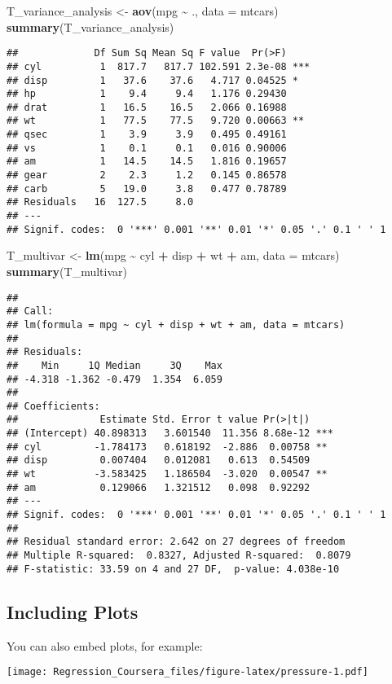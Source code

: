 \documentclass[
]{article}
\newenvironment{Shaded}{\begin{snugshade}}{\end{snugshade}}
\newcommand{\AttributeTok}[1]{\textcolor[rgb]{0.13,0.29,0.53}{#1}}
\newcommand{\FunctionTok}[1]{\textcolor[rgb]{0.13,0.29,0.53}{\textbf{#1}}}
\newcommand{\NormalTok}[1]{#1}
\newcommand{\OtherTok}[1]{\textcolor[rgb]{0.56,0.35,0.01}{#1}}
\newcommand{\SpecialCharTok}[1]{\textcolor[rgb]{0.81,0.36,0.00}{\textbf{#1}}}
\begin{document}
\begin{Shaded}
\begin{Highlighting}[]
\NormalTok{T\_variance\_analysis }\OtherTok{\textless{}{-}} \FunctionTok{aov}\NormalTok{(mpg }\SpecialCharTok{\textasciitilde{}}\NormalTok{ ., }\AttributeTok{data =}\NormalTok{ mtcars)}
\FunctionTok{summary}\NormalTok{(T\_variance\_analysis)}
\end{Highlighting}
\end{Shaded}

\begin{verbatim}
##             Df Sum Sq Mean Sq F value  Pr(>F)    
## cyl          1  817.7   817.7 102.591 2.3e-08 ***
## disp         1   37.6    37.6   4.717 0.04525 *  
## hp           1    9.4     9.4   1.176 0.29430    
## drat         1   16.5    16.5   2.066 0.16988    
## wt           1   77.5    77.5   9.720 0.00663 ** 
## qsec         1    3.9     3.9   0.495 0.49161    
## vs           1    0.1     0.1   0.016 0.90006    
## am           1   14.5    14.5   1.816 0.19657    
## gear         2    2.3     1.2   0.145 0.86578    
## carb         5   19.0     3.8   0.477 0.78789    
## Residuals   16  127.5     8.0                    
## ---
## Signif. codes:  0 '***' 0.001 '**' 0.01 '*' 0.05 '.' 0.1 ' ' 1
\end{verbatim}

\begin{Shaded}
\begin{Highlighting}[]
\NormalTok{T\_multivar }\OtherTok{\textless{}{-}} \FunctionTok{lm}\NormalTok{(mpg }\SpecialCharTok{\textasciitilde{}}\NormalTok{ cyl }\SpecialCharTok{+}\NormalTok{ disp }\SpecialCharTok{+}\NormalTok{ wt }\SpecialCharTok{+}\NormalTok{ am, }\AttributeTok{data =}\NormalTok{ mtcars)}
\FunctionTok{summary}\NormalTok{(T\_multivar)}
\end{Highlighting}
\end{Shaded}

\begin{verbatim}
## 
## Call:
## lm(formula = mpg ~ cyl + disp + wt + am, data = mtcars)
## 
## Residuals:
##    Min     1Q Median     3Q    Max 
## -4.318 -1.362 -0.479  1.354  6.059 
## 
## Coefficients:
##              Estimate Std. Error t value Pr(>|t|)    
## (Intercept) 40.898313   3.601540  11.356 8.68e-12 ***
## cyl         -1.784173   0.618192  -2.886  0.00758 ** 
## disp         0.007404   0.012081   0.613  0.54509    
## wt          -3.583425   1.186504  -3.020  0.00547 ** 
## am           0.129066   1.321512   0.098  0.92292    
## ---
## Signif. codes:  0 '***' 0.001 '**' 0.01 '*' 0.05 '.' 0.1 ' ' 1
## 
## Residual standard error: 2.642 on 27 degrees of freedom
## Multiple R-squared:  0.8327, Adjusted R-squared:  0.8079 
## F-statistic: 33.59 on 4 and 27 DF,  p-value: 4.038e-10
\end{verbatim}

\subsection{Including Plots}\label{including-plots}

You can also embed plots, for example:

\texttt{[image: Regression\_Coursera\_files/figure-latex/pressure-1.pdf]}
\end{document}
